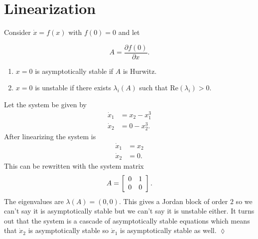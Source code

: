 \mainmatter%
\setcounter{page}{1}

\lectureseries[\course]{\course}

\date{February 11, 2010}

\setaddress%

\setcounter{lecture}{11}
\setcounter{chapter}{11}


\section{Linearization}
\begin{theorem}
Consider $\dot{x}=f(x)$ with $f(0)=0$ and let

\begin{equation*}
A = \frac{\partial f(0)}{\partial x}.
\end{equation*}

\begin{enumerate}
\item $x=0$ is asymptotically stable if $A$ is Hurwitz.
\item $x=0$ is unstable if there exists $\lambda_i(A)$ such that $\text{Re}(\lambda_i) > 0$.
\end{enumerate}
\end{theorem}

\begin{example}
Let the system be given by
\begin{align*}
\dot{x}_1 &= x_2-x_1^3 \\
\dot{x}_2 &= 0-x_2^3.
\end{align*}
After linearizing the system is
\begin{align*}
\dot{x}_1 &= x_2 \\
\dot{x}_2 &= 0.
\end{align*}
This can be rewritten with the system matrix
\begin{align*}
A = \left[\begin{array}{c c} 0 & 1 \\ 0 & 0 \end{array}\right].
\end{align*}
The eigenvalues are $\lambda(A)=(0,0)$.
This gives a Jordan block of order $2$ so we can't say it is asymptotically stable but we can't say it is unstable either.
It turns out that the system is a cascade of asymptotically stable equations which means that $\dot{x}_2$ is asymptotically stable so $\dot{x}_1$ is asymptotically stable as well.
$\lozenge$
\end{example}

